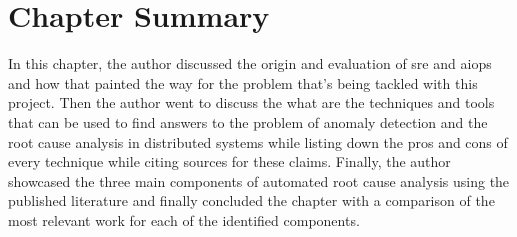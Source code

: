 \section{Chapter Summary}

In this chapter, the author discussed the origin and evaluation of \ac{sre} and \ac{aiops} and how that painted the way for the problem that's being tackled with this project. Then the author went to discuss the what are the techniques and tools that can be used to find answers to the problem of anomaly detection and the root cause analysis in distributed systems while listing down the pros and cons of every technique while citing sources for these claims. Finally, the author showcased the three main components of automated root cause analysis using the published literature and finally concluded the chapter with a comparison of the most relevant work for each of the identified components. 